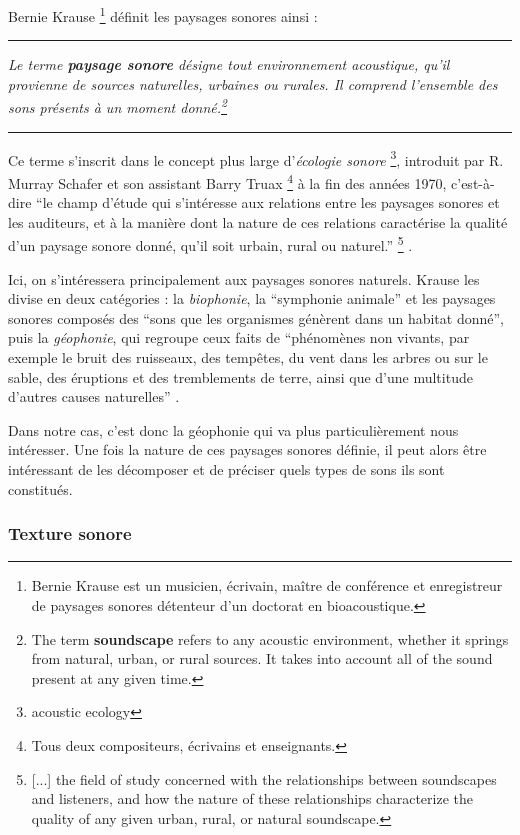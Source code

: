 ﻿\documentclass[12pt]{article}
\newcommand{\citationpropre}[3]{
\vspace{1.7em}
\hrule
\vspace{0.8em}

\textit{#1}

\hfill \parencite[#2]{#3}

\vspace{0.6em}
\hrule
\vspace{1.7em}
}
\begin{document}
Bernie Krause \footnote{Bernie Krause est un musicien, écrivain, maître de conférence et enregistreur de paysages sonores détenteur d'un doctorat en bioacoustique.} définit les paysages sonores ainsi :

\citationpropre{Le terme \textbf{paysage sonore} désigne tout environnement acoustique, qu'il provienne de sources naturelles, urbaines ou rurales. Il comprend l'ensemble des sons présents à un moment donné.\footnote{The term \textbf{soundscape} refers to any acoustic environment, whether it springs from natural, urban, or rural sources. It takes into account all of the sound present at any given time.}}{p.~22}{krause_wild_2002}

Ce terme s'inscrit dans le concept plus large d'\textit{écologie sonore} \footnote{acoustic ecology}, introduit par R. Murray Schafer et son assistant Barry Truax \footnote{Tous deux compositeurs, écrivains et enseignants.} à la fin des années 1970, c'est-à-dire \enquote{le champ d'étude qui s'intéresse aux relations entre les paysages sonores et les auditeurs, et à la manière dont la nature de ces relations caractérise la qualité d'un paysage sonore donné, qu'il soit urbain, rural ou naturel.} \footnote{[...] the field of study concerned with the relationships between soundscapes and listeners, and how the nature of these relationships characterize the quality of any given urban, rural, or natural soundscape.} \parencite{krause_wild_2002}. 

Ici, on s'intéressera principalement aux paysages sonores naturels. Krause les divise en deux catégories : la \textit{biophonie}, la \enquote{symphonie animale} et les paysages sonores composés des \enquote{sons que les organismes génèrent dans un habitat donné}, puis la \textit{géophonie}, qui regroupe ceux faits de \enquote{phénomènes non vivants, par exemple le bruit des ruisseaux, des tempêtes, du vent dans les arbres ou sur le sable, des éruptions et des tremblements de terre, ainsi que d'une multitude d'autres causes naturelles} \parencite{krause_wild_2002}.

Dans notre cas, c'est donc la géophonie qui va plus particulièrement nous intéresser. Une fois la nature de ces paysages sonores définie, il peut alors être intéressant de les décomposer et de préciser quels types de sons ils sont constitués.

\subsubsection{Texture sonore}
\end{document}
